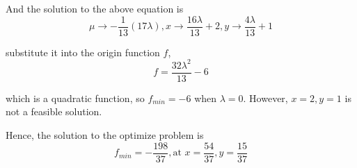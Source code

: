 \documentclass[11pt]{article}
\begin{document}
And the solution to the above equation is 
$$
\mu \to -\frac{1}{13} (17 \lambda ),x\to \frac{16 \lambda }{13}+2,y\to \frac{4 \lambda }{13}+1
$$

substitute it into the origin function $f$,
$$
f = \frac{32 \lambda ^2}{13}-6
$$

which is a quadratic function, so $f_{min} = -6$ when $\lambda = 0$. However, $x =  2,y =1$ is not a feasible solution.

Hence, the solution to the optimize problem is
$$
f_{min} = -\frac{198}{37},\text{at }x =  \frac{54}{37},y =  \frac{15}{37}
$$
\end{document}
